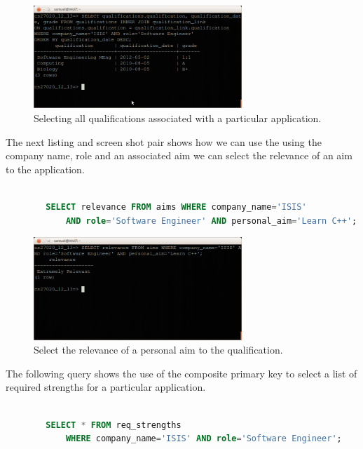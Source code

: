 \documentclass{article}
\begin{document}
\begin{figure}[H]
\centering
\includegraphics[width=0.7\textwidth]{img/test/test-qual-link.png}
\caption{Selecting all qualifications associated with a particular application.}
\label{fig:test-qual-link}
\end{figure}

The next listing and screen shot pair shows how we can use the using the company name, role and an associated aim we can select the relevance of an aim to the application.

\begin{center}
	\begin{lstlisting}[language=sql, showstringspaces=false]

		SELECT relevance FROM aims WHERE company_name='ISIS' 
			AND role='Software Engineer' AND personal_aim='Learn C++';

	\end{lstlisting}
\end{center}

\begin{figure}[H]
\centering
\includegraphics[width=0.7\textwidth]{img/test/test-select-relevance.png}
\caption{Select the relevance of a personal aim to the qualification.}
\label{fig:test-select-relevance}
\end{figure}

The following query shows the use of the composite primary key to select a list of required strengths for a particular application.

\begin{center}
	\begin{lstlisting}[language=sql, showstringspaces=false]

		SELECT * FROM req_strengths
			WHERE company_name='ISIS' AND role='Software Engineer';

	\end{lstlisting}
\end{center}
\end{document}
